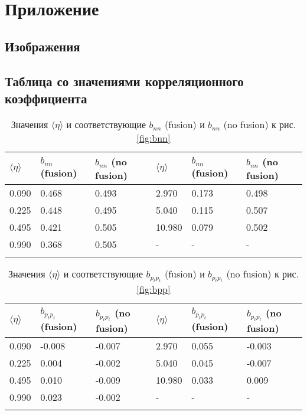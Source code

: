 \section{Приложение}
\subsection{Изображения}
\subsection{Таблица со значениями корреляционного коэффициента}
{\scriptsize
\begin{longtable}{| l | l | l || l | l | l |}
	\hline
	$\langle \eta \rangle$	&	$b_{nn}$ (fusion)	&	$b_{nn}$ (no fusion)	&	$\langle \eta \rangle$	&	$b_{nn}$ (fusion)	&	$b_{nn}$ (no fusion)	\\
	\hline
	0.090	&	0.468	&	0.493	&	2.970	&	0.173	&	0.498	\\
	0.225	&	0.448	&	0.495	&	5.040	&	0.115	&	0.507	\\
	0.495	&	0.421	&	0.505	&	10.980	&	0.079	&	0.502	\\
	0.990	&	0.368	&	0.505	&	-		&	-		&		-	\\
	\hline
	\caption{Значения $\langle \eta \rangle$ и соответствующие $b_{nn}$ (fusion) и $b_{nn}$ (no fusion) к рис. \ref{fig:bnn}} \label{tab:bnn}
\end{longtable}}

{\scriptsize
\begin{longtable}{| l | l | l || l | l | l |}
	\hline
	$\langle \eta \rangle$	&	$b_{p_tp_t}$ (fusion)	&	$b_{p_tp_t}$ (no fusion)	&	$\langle \eta \rangle$	&	$b_{p_tp_t}$ (fusion)	&	$b_{p_tp_t}$ (no fusion)	\\
	\hline
	0.090	&	-0.008	&	-0.007	&	2.970	&	0.055	&	-0.003	\\
	0.225	&	0.004	&	-0.002	&	5.040	&	0.045	&	-0.007	\\
	0.495	&	0.010	&	-0.009	&	10.980	&	0.033	&	0.009	\\
	0.990	&	0.023	&	-0.002	&	-		&	-		&		-	\\
	\hline
	\caption{Значения $\langle \eta \rangle$ и соответствующие $b_{p_tp_t}$ (fusion) и $b_{p_tp_t}$ (no fusion) к рис. \ref{fig:bpp}} \label{tab:bnn}
\end{longtable}}

